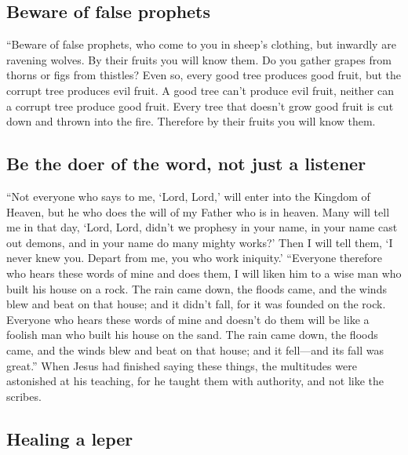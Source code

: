 \hypertarget{beware-of-false-prophets}{%
\subsection{Beware of false prophets}\label{beware-of-false-prophets}}

 ``Beware of false prophets, who come to you in sheep's
clothing, but inwardly are ravening wolves.  By their
fruits you will know them. Do you gather grapes from thorns or figs from
thistles?  Even so, every good tree produces good fruit,
but the corrupt tree produces evil fruit.  A good tree
can't produce evil fruit, neither can a corrupt tree produce good fruit.
 Every tree that doesn't grow good fruit is cut down and
thrown into the fire.  Therefore by their fruits you will
know them.

\hypertarget{be-the-doer-of-the-word-not-just-a-listener}{%
\subsection{Be the doer of the word, not just a
listener}\label{be-the-doer-of-the-word-not-just-a-listener}}

 ``Not everyone who says to me, `Lord, Lord,' will enter
into the Kingdom of Heaven, but he who does the will of my Father who is
in heaven.  Many will tell me in that day, `Lord, Lord,
didn't we prophesy in your name, in your name cast out demons, and in
your name do many mighty works?'  Then I will tell them,
`I never knew you. Depart from me, you who work iniquity.'
 ``Everyone therefore who hears these words of mine and
does them, I will liken him to a wise man who built his house on a rock.
 The rain came down, the floods came, and the winds blew
and beat on that house; and it didn't fall, for it was founded on the
rock.  Everyone who hears these words of mine and doesn't
do them will be like a foolish man who built his house on the sand.
 The rain came down, the floods came, and the winds blew
and beat on that house; and it fell---and its fall was great.''
 When Jesus had finished saying these things, the
multitudes were astonished at his teaching,  for he
taught them with authority, and not like the scribes.

\hypertarget{healing-a-leper}{%
\subsection{Healing a leper}\label{healing-a-leper}}

